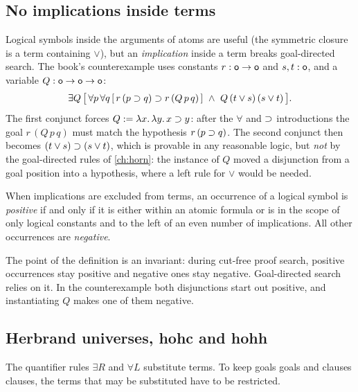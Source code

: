 \subsection{No implications inside terms}\label{sec:hoprog-noimp}

Logical symbols inside the arguments of atoms are useful (the symmetric closure
 is a term containing $\vee$), but an \emph{implication} inside a term breaks
goal-directed search. The book's counterexample  uses constants $r:\mathsf{o}\to\mathsf{o}$ and
$s,t:\mathsf{o}$, and a variable $Q:\mathsf{o}\to\mathsf{o}\to\mathsf{o}$:
\[
\exists Q\,\big[\,\forall p\,\forall q\,[\,r\,(p\supset q)\supset r\,(Q\,p\,q)\,]\ \wedge\ Q\,(t\vee s)\,(s\vee t)\,\big].
\]
The first conjunct forces $Q := \lambda x.\,\lambda y.\,x\supset y$: after the $\forall$ and $\supset$ introductions
the goal $r\,(Q\,p\,q)$ must match the hypothesis $r\,(p\supset q)$. The second conjunct then becomes
$(t\vee s)\supset(s\vee t)$, which is provable in any reasonable logic, but \emph{not} by the goal-directed
rules of \cref{ch:horn}: the instance of $Q$ moved a disjunction from a goal position into a hypothesis,
where a left rule for $\vee$ would be needed.

\begin{definition}\label{def:hoprog-polarity}
When implications are excluded from terms, an occurrence of a logical symbol is \emph{positive} if and
only if it is either within an atomic formula or is in the scope of only logical constants and to the
left of an even number of implications. All other occurrences are \emph{negative}.
\end{definition}

The point of the definition is an invariant: during cut-free proof search, positive occurrences stay
positive and negative ones stay negative. Goal-directed search relies on it. In the counterexample both
disjunctions start out positive, and instantiating $Q$ makes one of them negative.

\subsection{Herbrand universes, hohc and hohh}\label{sec:hoprog-hohc}

The quantifier rules $\exists R$ and $\forall L$ substitute terms. To keep goals goals and clauses clauses,
the terms that may be substituted have to be restricted.

